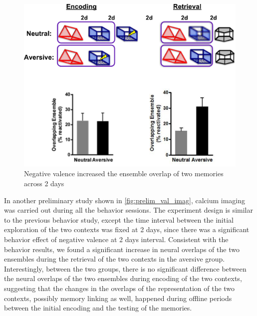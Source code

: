 \documentclass[master.tex]{subfiles}
\begin{document}
\begin{figure}
  \centering \includegraphics[scale = .4]{Figures/val_retro_prelim_imag.pdf}
  \caption{\footnotesize Negative valence increased the ensemble overlap of two
    memories across 2 days}
  \label{fig:prelim_val_imag}
\end{figure}

In another preliminary study shown in \autoref{fig:prelim_val_imag}, calcium
imaging was carried out during all the behavior sessions. The experiment design
is similar to the previous behavior study, except the time interval between the
initial exploration of the two contexts was fixed at 2 days, since there was a
significant behavior effect of negative valence at 2 days interval. Consistent
with the behavior results, we found a significant increase in neural overlaps of
the two ensembles during the retrieval of the two contexts in the aversive
group. Interestingly, between the two groups, there is no significant difference
between the neural overlaps of the two ensembles during encoding of the two
contexts, suggesting that the changes in the overlaps of the representation of
the two contexts, possibly memory linking as well, happened during offline
periods between the initial encoding and the testing of the memories.
\end{document}
